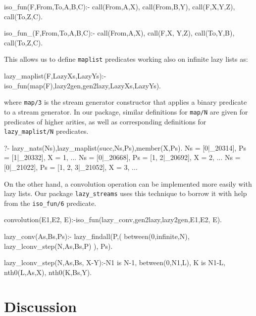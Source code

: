 \documentclass{new_tlp}
\begin{document}
\begin{codeh}
%
iso_fun(F,From,To,A,B,C):-
  call(From,A,X),
  call(From,B,Y),
  call(F,X,Y,Z),
  call(To,Z,C).

%
iso_fun_(F,From,To,A,B,C):- 
  call(From,A,X),
  call(F,X, Y,Z), %
  call(To,Y,B),
  call(To,Z,C).
\end{codeh}


This allows us to define {\tt maplist} predicates working also
on infinite lazy lists as:

\begin{code}
lazy_maplist(F,LazyXs,LazyYs):-iso_fun(map(F),lazy2gen,gen2lazy,LazyXs,LazyYs).
\end{code}
where {\tt map/3} is the stream generator constructor that applies a binary
predicate to a stream generator. In our package, similar definitions for {\tt map/N}
are given for predicates of higher arities, as well as corresponding definitions for
{\tt lazy\_maplist/N} predicates.

\BX
\begin{codex}
?- lazy_nats(Ns),lazy_maplist(succ,Ns,Ps),member(X,Ps).
Ns = [0|_20314], Ps = [1|_20332], X = 1,
...
Ns = [0|_20668], Ps = [1, 2|_20692], X = 2,
...
Ns = [0|_21022], Ps = [1, 2, 3|_21052], X = 3,
...
\end{codex}
\EX

On the other hand, a convolution operation  can be implemented more easily with lazy lists. Our package {\tt lazy\_streams} uses this technique to borrow it with help from the {\tt iso\_fun/6} predicate.
\begin{code}
convolution(E1,E2, E):-iso_fun(lazy_conv,gen2lazy,lazy2gen,E1,E2, E).

lazy_conv(As,Bs,Ps):-
  lazy_findall(P,(
    between(0,infinite,N),
    lazy_lconv_step(N,As,Bs,P)
  ),
  Ps).

lazy_lconv_step(N,As,Bs, X-Y):-N1 is N-1,
   between(0,N1,L), K is N1-L,
   nth0(L,As,X), nth0(K,Bs,Y).
\end{code}

\section{Discussion}
\end{document}
